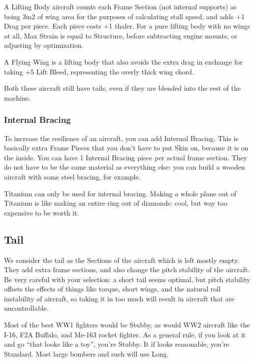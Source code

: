 \documentclass{article}
\begin{document}
A Lifting Body aircraft counts each Frame Section (not internal
supports) as being 3m2 of wing area for the purposes of calculating
stall speed, and adds +1 Drag per piece. Each piece costs +1 thaler. For
a pure lifting body with no wings at all, Max Strain is equal to
Structure, before subtracting engine mounts, or adjusting by
optimization.

A Flying Wing is a lifting body that also avoids the extra drag
in exchange for taking +5 Lift Bleed, representing the overly thick wing
chord.

Both these aircraft still have tails, even if they are blended
into the rest of the machine.

\subsubsection{Internal Bracing}
\label{_Internal Bracing}

To increase the resilience of an aircraft, you can add Internal Bracing.
This is basically extra Frame Pieces that you don't have to put Skin on,
because it is on the inside. You can have 1 Internal Bracing piece per
actual frame section. They do not have to be the same material as
everything else: you can build a wooden aircraft with some steel
bracing, for example.

Titanium can only be used for internal bracing. Making a whole plane out
of Titanium is like making an entire ring out of diamonds: cool, but way
too expensive to be worth it.

\subsection{Tail}
\label{_Tail}

We consider the tail as the Sections of the aircraft which is left
mostly empty. They add extra frame sections, and also change the pitch
stability of the aircraft. Be very careful with your selection: a short
tail seems optimal, but pitch stability offsets the effects of things
like torque, short wings, and the natural roll instability of aircraft,
so taking it in too much will result in aircraft that are
uncontrollable.

Most of the best WW1 fighters would be Stubby, as would WW2 aircraft
like the I-16, F2A Buffalo, and Me-163 rocket fighter. As a general
rule, if you look at it and go ``that looks like a toy'', you're Stubby.
It if looks reasonable, you're Standard. Most large bombers and such
will use Long.
\end{document}
